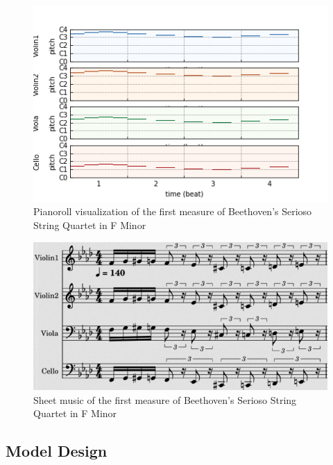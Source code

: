 \documentclass[sigconf,authorversion]{acmart}
\begin{document}
\begin{figure}[h]
  \centering
  \includegraphics[width=\linewidth]{first_bar.png}
  \caption{Pianoroll visualization of the first measure of
    Beethoven's Serioso String Quartet in F Minor}
  \label{pianoroll}
\end{figure}

\begin{figure}[h]
  \centering
  \includegraphics[width=\linewidth]{first_bar_sheet.png}
  \caption{Sheet music of the first measure of Beethoven's Serioso
    String Quartet in F Minor}
  \label{sheet}
\end{figure}

\subsection{Model Design}
\end{document}
